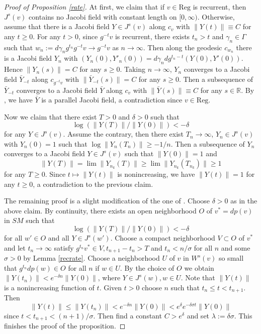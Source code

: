 \documentclass[11pt]{amsart}
\theoremstyle{definition}
\def\RR{{\mathbb R}}
\def\c{\gamma}   \def\C{\Gamma}
\def\d{\delta}   %
\begin{document}
\begin{proof}[Proof of Proposition \ref{rate}]
At first, we claim that if $v\in \text{Reg}$ is recurrent, then $J^s(v)$ contains no Jacobi field with constant length on $[0, \infty)$.
Otherwise, assume that there is a Jacobi field $Y\in J^s(v)$ along $c_v$ with $\|Y(t)\|\equiv C$ for any $t\ge 0$.
For any $t>0$, since $g^{-t}v$ is recurrent, there exists $t_n>t$ and $\gamma_n\in \Gamma$ such that $w_n:=d\c_ng^{t_n}g^{-t}v\to g^{-t}v$ as $n\to \infty$. Then along the geodesic $c_{w_n}$ there is a Jacobi field $Y_n$ with $(Y_n(0), Y'_n(0))=d\c_ndg^{t_n-t}(Y(0), Y'(0))$. Hence $\|Y_n(s)\|=C$ for any $s\ge 0$. Taking $n\to \infty$, $Y_n$ converges to a Jacobi field $\bar Y_{-t}$ along $c_{g^{-t}v}$ with $\|\bar Y_{-t}(s)\|=C$ for any $s\ge 0$. Then a subsequence of $\bar Y_{-t}$ converges to a Jacobi field $\bar Y$ along $c_v$ with $\|\bar{Y}(s)\|\equiv C$ for any $s\in \RR$. By \cite[Proposition 2.4]{Wat}, we have $\bar Y$ is a parallel Jacobi field, a contradiction since $v\in \text{Reg}$.

Now we claim that there exist $T>0$ and $\d>0$ such that
$$\log (\|Y(T)\|/\|Y(0)\|)<-\d$$
for any $Y\in J^s(v)$. Assume the contrary, then there exist $T_n\to \infty$, $Y_n\in J^s(v)$ with $Y_n(0)=1$ such that $\log \|Y_n(T_n)\|\ge -1/n$. Then a subsequence of $Y_n$ converges to a Jacobi field $Y\in J^s(v)$ such that $\|Y(0)\|=1$ and
$$\|Y(T)\|=\lim \|Y_{n_k}(T)\|\ge \lim \|Y_{n_k}(T_{n_k})\|\ge 1$$
for any $T\ge 0$. Since $t\mapsto \|Y(t)\|$ is nonincreasing, we have $\|Y(t)\|=1$ for any $t\ge 0$, a contradiction to the previous claim.

The remaining proof is a slight modification of the one of \cite[Lemma 3.4]{BBE}. Choose $\d>0$ as in the above claim. By continuity, there exists an open neighborhood $O$ of $v^*=dp(v)$ in $SM$ such that
$$\log (\|Y(T)\|/\|Y(0)\|)<-\d$$
for all $w'\in O$ and all $Y\in J^s(w')$. Choose a compact neighborhood $V\subset O$ of $v^*$ and let $t_n\to \infty$ satisfy $g^{t_n}v^*\in V, t_{n+1}-t_n> T$ and $t_n < n/\sigma$ for all $n$ and some $\sigma> 0$ by Lemma \ref{recrate}. Choose a neighborhood $U$ of $v$ in $W^s(v)$ so small that $g^{t_n}dp(w)\in O$ for all $n$ if $w\in U$. By the choice of $O$ we obtain $\|Y(t_n)\|< e^{-\d n}\|Y(0)\|$, where $Y\in J^s(w), w\in U$. Note that $\|Y(t)\|$ is a nonincreasing function of $t$. Given $t>0$ choose $n$ such that $t_n \le t < t_{n+1}$. Then
$$\|Y(t)\| \le \|Y(t_n)\|< e^{-\d n}\|Y(0)\| < e^\d e^{-\d\sigma t}\|Y(0)\|$$
since $t < t_{n+1} <(n+1)/\sigma$. Then find a constant $C>e^\d$ and set $\lambda:=\d\sigma$. This finishes the proof of the proposition.
\end{proof}
\end{document}
